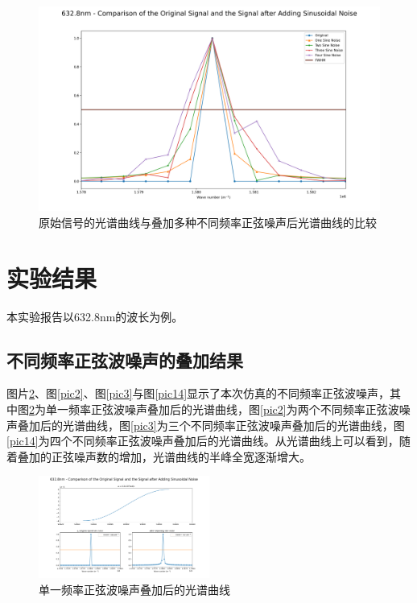 \documentclass[conference]{IEEEtran}
\begin{document}
\begin{figure}[htbp]
	\centerline{
		\includegraphics[width=22cm]{所有波放一起.png} 	
	}
	\caption{原始信号的光谱曲线与叠加多种不同频率正弦噪声后光谱曲线的比较}
	\label{pic7}
\end{figure}

\section{实验结果}
本实验报告以632.8nm的波长为例。
\subsection{不同频率正弦波噪声的叠加结果}
图片\ref{pic1}、图\ref{pic2}、图\ref{pic3}与图\ref{pic14}显示了本次仿真的不同频率正弦波噪声，其中图\ref{pic1}为单一频率正弦波噪声叠加后的光谱曲线，图\ref{pic2}为两个不同频率正弦波噪声叠加后的光谱曲线，图\ref{pic3}为三个不同频率正弦波噪声叠加后的光谱曲线，图\ref{pic14}为四个不同频率正弦波噪声叠加后的光谱曲线。从光谱曲线上可以看到，随着叠加的正弦噪声数的增加，光谱曲线的半峰全宽逐渐增大。

\begin{figure}[htbp]
    \centerline{\includegraphics[width=0.5\textwidth]{1种波叠加.png}}
    \caption{单一频率正弦波噪声叠加后的光谱曲线}
    \label{pic1}
\end{figure}
\end{document}

